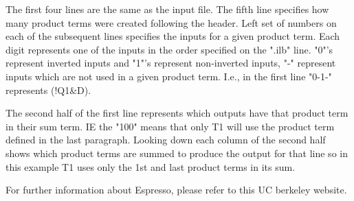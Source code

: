 The first four lines are the same as the input file. The fifth line specifies how many product terms were created following the header. Left set of numbers on each of the subsequent lines specifies the inputs for a given product term. Each digit represents one of the inputs in the order specified on the ".ilb" line. "0"'s represent inverted inputs and "1"'s represent non-inverted inputs, "-" represent inputs which are not used in a given product term. I.e., in the first line "0-1-" represents (!Q1&D).

The second half of the first line represents which outputs have that product term in their sum term. IE the "100" means that only T1 will use the product term defined in the last paragraph. Looking down each column of the second half shows which product terms are summed to produce the output for that line so in this example T1 uses only the 1st and last product terms in its sum.

For further information about Espresso, please refer to this UC berkeley website.
